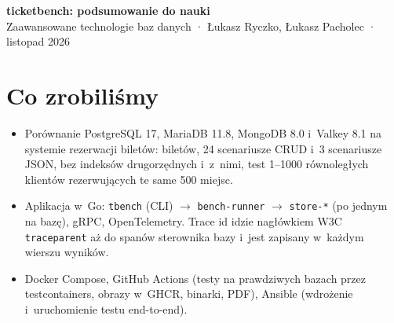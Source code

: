\documentclass[10pt,a4paper]{article}
\begin{document}
\begin{center}
{\Large\bfseries ticketbench: podsumowanie do nauki}\\[2pt]
Zaawansowane technologie baz danych · Łukasz Ryczko, Łukasz Pacholec · listopad 2026
\end{center}

\section*{Co zrobiliśmy}
\begin{itemize}
  \item Porównanie PostgreSQL 17, MariaDB 11.8, MongoDB 8.0 i~Valkey 8.1 na
  systemie rezerwacji biletów: \SizesList{} biletów, 24 scenariusze CRUD
  i~3 scenariusze JSON, bez indeksów drugorzędnych i~z~nimi, test 1--1000
  równoległych klientów rezerwujących te same 500 miejsc.
  \item Aplikacja w~Go: \texttt{tbench} (CLI) $\to$ \texttt{bench-runner}
  $\to$ \texttt{store-*} (po jednym na bazę), gRPC, OpenTelemetry. Trace id
  idzie nagłówkiem W3C \texttt{traceparent} aż do spanów sterownika bazy
  i~jest zapisany w~każdym wierszu wyników.
  \item Docker Compose, GitHub Actions (testy na prawdziwych bazach przez
  testcontainers, obrazy w~GHCR, binarki, PDF), Ansible (wdrożenie i~uruchomienie
  testu end-to-end).
\end{itemize}


\end{document}

